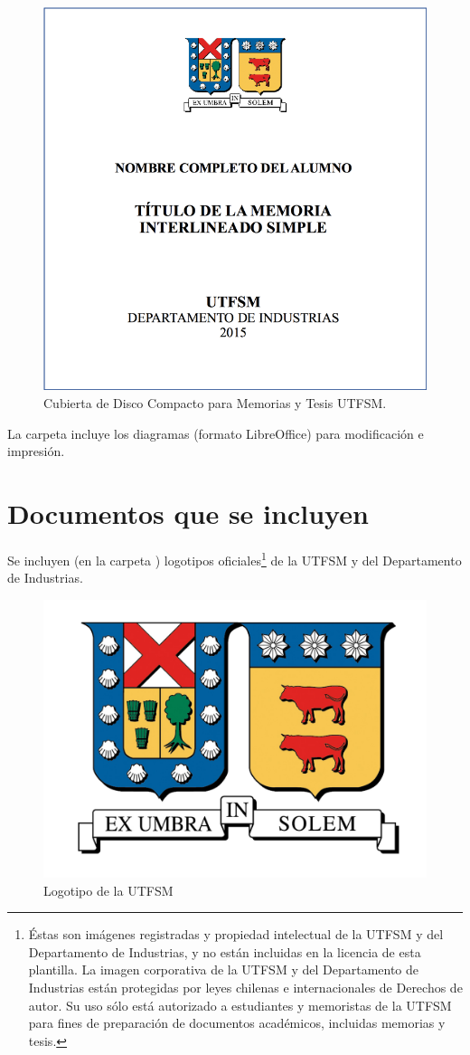 \begin{figure}[ht!]
    \centering
    \includegraphics[width=.4\textwidth]{figures/thesis_cd_cover.png}
    \caption{Cubierta de Disco Compacto para Memorias y Tesis UTFSM.}
    \label{fig:thesis_cd_cover}
\end{figure}


La carpeta  incluye los diagramas (formato LibreOffice) para modificación e impresión.

\section{Documentos que se incluyen}

Se incluyen (en la carpeta ) logotipos oficiales\footnote{Éstas son imágenes registradas y propiedad intelectual de la UTFSM y del Departamento de Industrias, y no están incluidas en la licencia de esta plantilla. La imagen corporativa de la UTFSM y del Departamento de Industrias están protegidas por leyes chilenas e internacionales de Derechos de autor. Su uso sólo está autorizado a estudiantes y memoristas de la UTFSM para fines de preparación de documentos académicos, incluidas memorias y tesis.}
de la UTFSM y del Departamento de Industrias.

\begin{figure}[ht!]
\centering
\includegraphics[scale = .5]{figures/logousm.png}
\caption{Logotipo de la UTFSM}
\label{fig:logousm}
\end{figure}


